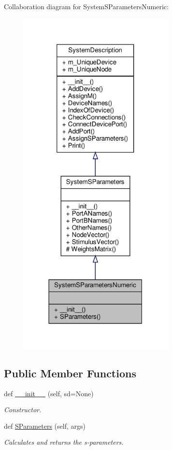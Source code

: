 Collaboration diagram for System\+S\+Parameters\+Numeric\+:
\nopagebreak
\begin{figure}[H]
\begin{center}
\leavevmode
\includegraphics[width=224pt]{classSignalIntegrity_1_1SystemDescriptions_1_1SystemSParametersNumeric_1_1SystemSParametersNumeric__coll__graph}
\end{center}
\end{figure}
\subsection*{Public Member Functions}
\begin{DoxyCompactItemize}
\item 
def \hyperlink{classSignalIntegrity_1_1SystemDescriptions_1_1SystemSParametersNumeric_1_1SystemSParametersNumeric_a2fa2ae61a4511a760e2d2047ec07eb05}{\+\_\+\+\_\+init\+\_\+\+\_\+} (self, sd=None)
\begin{DoxyCompactList}\small\item\em Constructor. \end{DoxyCompactList}\item 
def \hyperlink{classSignalIntegrity_1_1SystemDescriptions_1_1SystemSParametersNumeric_1_1SystemSParametersNumeric_a021c12a7e391dbcb5904bb9a1e3c6294}{S\+Parameters} (self, args)
\begin{DoxyCompactList}\small\item\em Calculates and returns the s-\/parameters. \end{DoxyCompactList}\end{DoxyCompactItemize}
